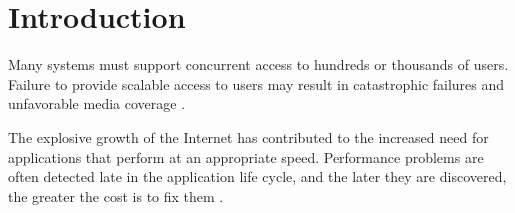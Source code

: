 \documentclass{bmcart}
\begin{document}
\begin{frontmatter}
\begin{abstractbox}
\begin{keyword}
\end{keyword}


\end{abstractbox}
%

\end{frontmatter}




\section{Introduction}

Many systems must support concurrent access to hundreds or thousands of users. Failure to provide scalable access to users may result in catastrophic failures and unfavorable media coverage \citep{Jiang2010}. 

The explosive growth of the Internet has contributed to the increased need for applications that perform at an appropriate speed. Performance problems are often detected late in the application life cycle, and the later they are discovered, the greater the cost is to fix them \citep{Molyneaux2009}.
\end{document}
